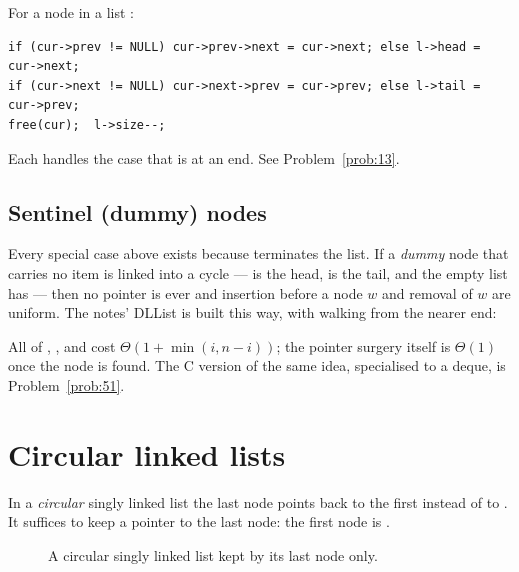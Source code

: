 
 For a node  in a list :
\begin{lstlisting}[numbers=none,frame=none,xleftmargin=1em]
if (cur->prev != NULL) cur->prev->next = cur->next; else l->head = cur->next;
if (cur->next != NULL) cur->next->prev = cur->prev; else l->tail = cur->prev;
free(cur);  l->size--;
\end{lstlisting}
Each  handles the case that  is at an end. See Problem~\ref{prob:13}.

\subsection{Sentinel (dummy) nodes}\label{sec:sentinel}

Every special case above exists because  terminates the list. If a \emph{dummy}
node that carries no item is linked into a cycle ---  is the head,
 is the tail, and the empty list has  ---
then no pointer is ever  and insertion before a node $w$ and removal of $w$ are
uniform. The notes' DLList is built this way, with  walking from the
nearer end:


All of , ,  and  cost $\Theta(1+\min(i,n-i))$; the
pointer surgery itself is $\Theta(1)$ once the node is found. The C version of the same
idea, specialised to a deque, is Problem~\ref{prob:51}.

\section{Circular linked lists}\label{sec:circular}

\begin{definition}
In a \emph{circular} singly linked list the last node points back to the first instead of
to . It suffices to keep a pointer  to the last node: the first node is
.
\end{definition}

\begin{figure}[ht]\centering
{}
\caption{A circular singly linked list kept by its last node only.}
\end{figure}

